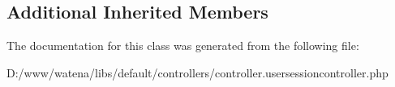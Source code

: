 \subsection*{Additional Inherited Members}


The documentation for this class was generated from the following file\-:\begin{DoxyCompactItemize}
\item 
D\-:/www/watena/libs/default/controllers/controller.\-usersessioncontroller.\-php\end{DoxyCompactItemize}
